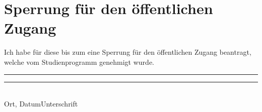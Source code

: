 \section*{\centering Sperrung für den öffentlichen Zugang}\thispagestyle{plain}\label{sperrung}
Ich habe für diese \thesis\space bis zum \preclusiondate\space eine Sperrung für den öffentlichen Zugang beantragt, welche vom Studienprogramm genehmigt wurde.

\vspace{2.5cm}

\rule{5cm}{0.2pt}\hfill\rule{5cm}{0.2pt}\\
\footnotesize\phantom{}\hspace{17mm} Ort, Datum\hfill Unterschrift \hspace{17mm}
\clearpage\normalsize
